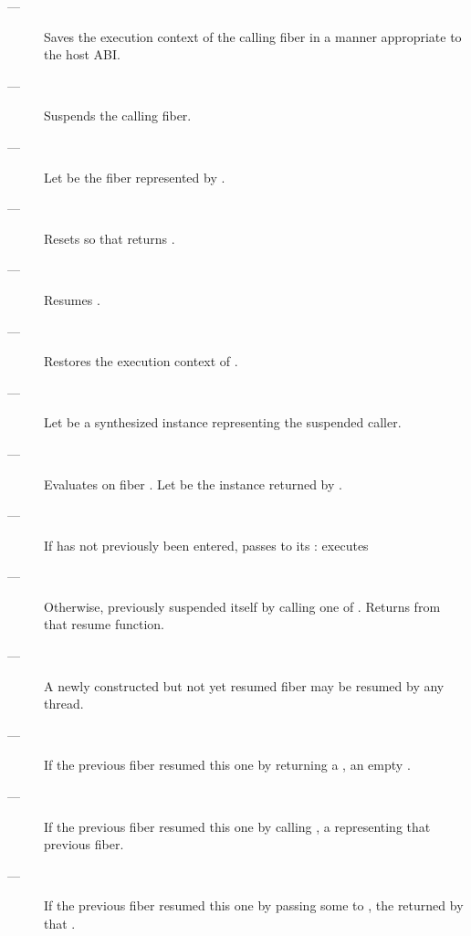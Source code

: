\effects
\begin{description}
    \item[---] Saves the execution context of the calling fiber in a manner
               appropriate to the host ABI.
    \item[---] Suspends the calling fiber.
    \item[---] Let  be the fiber represented by .
    \item[---] Resets  so that  returns .
    \item[---] Resumes .
    \item[---] Restores the execution context of .
    \item[---] Let  be a synthesized \fiber instance representing
               the suspended caller.
    \item[---] Evaluates 
               on fiber .
               Let  be the \fiber instance returned by .
    \item[---] If  has not previously been
               entered, passes  to its \entryfn: executes\\
    \item[---] Otherwise,  previously
               suspended itself by calling one of \anyresume.
               Returns  from that resume function.
\end{description}

\remarks
\begin{description}
    \item[---] A newly constructed but not yet resumed fiber may be resumed by
              any thread.
\end{description}

\returns
\begin{description}
    \item[---] If the previous fiber resumed this one by returning a \fiber,
               an empty \fiber.
    \item[---] If the previous fiber resumed this one by calling \someresume,
               a \fiber representing that previous fiber.
    \item[---] If the previous fiber resumed this one by passing some 
               to \anyresumewith, the \fiber returned by that .
\end{description}

